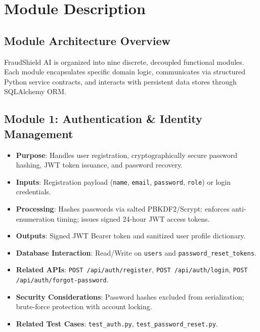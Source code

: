 \chapter{Module Description}
\label{chap:modules}

\section{Module Architecture Overview}
FraudShield AI is organized into nine discrete, decoupled functional modules. Each module encapsulates specific domain logic, communicates via structured Python service contracts, and interacts with persistent data stores through SQLAlchemy ORM.

\section{Module 1: Authentication \& Identity Management}
\begin{itemize}
    \item \textbf{Purpose}: Handles user registration, cryptographically secure password hashing, JWT token issuance, and password recovery.
    \item \textbf{Inputs}: Registration payload (\texttt{name}, \texttt{email}, \texttt{password}, \texttt{role}) or login credentials.
    \item \textbf{Processing}: Hashes passwords via salted PBKDF2/Scrypt; enforces anti-enumeration timing; issues signed 24-hour JWT access tokens.
    \item \textbf{Outputs}: Signed JWT Bearer token and sanitized user profile dictionary.
    \item \textbf{Database Interaction}: Read/Write on \texttt{users} and \texttt{password\_reset\_tokens}.
    \item \textbf{Related APIs}: \texttt{POST /api/auth/register}, \texttt{POST /api/auth/login}, \texttt{POST /api/auth/forgot-password}.
    \item \textbf{Security Considerations}: Password hashes excluded from serialization; brute-force protection with account locking.
    \item \textbf{Related Test Cases}: \texttt{test\_auth.py}, \texttt{test\_password\_reset.py}.
\end{itemize}

